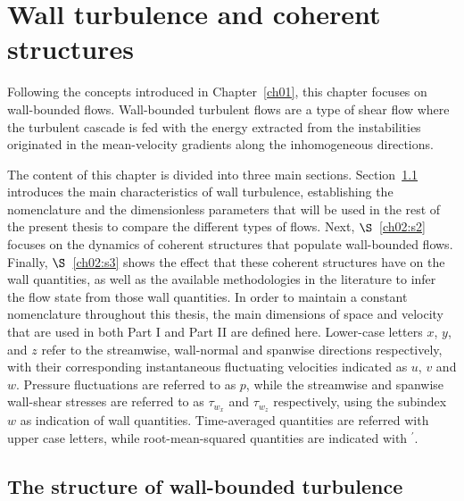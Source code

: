 \chapter{Wall turbulence and coherent structures}\label{ch02}
%

Following the concepts introduced in Chapter~\ref{ch01}, this chapter focuses on wall-bounded flows.
Wall-bounded turbulent flows are a type of shear flow where the turbulent cascade is fed with the energy extracted from the instabilities originated in the mean-velocity gradients along the inhomogeneous directions.

The content of this chapter is divided into three main sections.
Section~\ref{ch02:s1} introduces the main characteristics of wall turbulence, establishing the nomenclature and the dimensionless parameters that will be used in the rest of the present thesis to compare the different types of flows.
Next, $\S$~\ref{ch02:s2} focuses on the dynamics of coherent structures that populate wall-bounded flows.
Finally, $\S$~\ref{ch02:s3} shows the effect that these coherent structures have on the wall quantities, as well as the available methodologies in the literature to infer the flow state from those wall quantities.
In order to maintain a constant nomenclature throughout this thesis, the main dimensions of space and velocity that are used in both Part I and Part II are defined here.
Lower-case letters $x$, $y$, and $z$ refer to the streamwise, wall-normal and spanwise directions respectively, with their corresponding instantaneous fluctuating velocities indicated as $u$, $v$ and $w$.
Pressure fluctuations are referred to as $p$, while the streamwise and spanwise wall-shear stresses are referred to as $\tau_{w_x}$ and $\tau_{w_z}$ respectively, using the subindex $w$ as indication of wall quantities.
Time-averaged quantities are referred with upper case letters, while root-mean-squared quantities are indicated with $^{\prime}$.

\section{The structure of wall-bounded turbulence}\label{ch02:s1}

